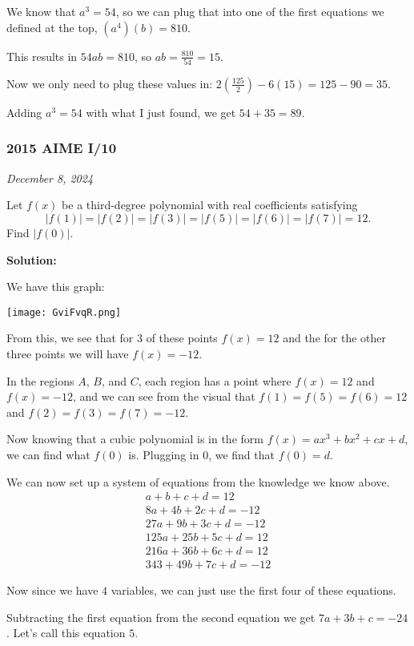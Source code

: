 \documentclass[../mathproblems.tex]{subfiles}
\begin{document}
We know that $a^3=54$, so we can plug that into one of the first equations we defined at the top, $(a^4)(b)=810$.

This results in $54ab=810$, so $ab=\frac{810}{54} = 15$.

Now we only need to plug these values in: $2\left(\frac{125}{2}\right) - 6(15) = 125-90 = 35$.

Adding $a^3 = 54$ with what I just found, we get $54+35 = \boxed{89}$.

\noindent\hrulefill

\subsubsection*{2015 AIME I/10}
\textit{December 8, 2024}

Let $f(x)$ be a third-degree polynomial with real coefficients satisfying \[|f(1)|=|f(2)|=|f(3)|=|f(5)|=|f(6)|=|f(7)|=12.\] Find $|f(0)|$. 

\textbf{Solution:}

We have this graph:
\begin{center}
    \texttt{[image: GviFvqR.png]}
\end{center}

From this, we see that for $3$ of these points $f(x)=12$ and the for the other three points we will have $f(x)=-12$.

In the regions $A$, $B$, and $C$, each region has a point where $f(x)=12$ and $f(x)=-12$, and we can see from the visual that $f(1)=f(5)=f(6)=12$ and $f(2)=f(3)=f(7)=-12$.

Now knowing that a cubic polynomial is in the form $f(x) = ax^3+bx^2+cx+d$, we can find what $f(0)$ is. Plugging in $0$, we find that $f(0)=d$. 

We can now set up a system of equations from the knowledge we know above.
\begin{align*}
a+b+c+d=12\\
8a+4b+2c+d=-12\\
27a+9b+3c+d=-12\\
125a+25b+5c+d=12\\
216a+36b+6c+d=12\\
343+49b+7c+d=-12
\end{align*}

Now since we have $4$ variables, we can just use the first four of these equations.

Subtracting the first equation from the second equation we get $7a+3b+c=-24$. Let's call this equation $5$.
\end{document}
